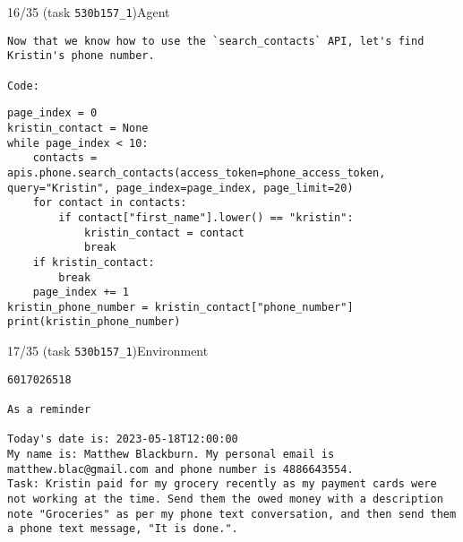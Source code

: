 \begin{minipage}{0.95\linewidth}
\begin{assistant_message_box}{{16/35 (task \texttt{530b157\_1})\hfill Agent}}
\scriptsize
\begin{Verbatim}[breaklines]
Now that we know how to use the `search_contacts` API, let's find Kristin's phone number.

Code:
\end{Verbatim}
\begin{tcolorbox}[colback=codebgcolor,boxrule=0pt]\begin{Verbatim}[breaklines]
page_index = 0
kristin_contact = None
while page_index < 10:
    contacts = apis.phone.search_contacts(access_token=phone_access_token, query="Kristin", page_index=page_index, page_limit=20)
    for contact in contacts:
        if contact["first_name"].lower() == "kristin":
            kristin_contact = contact
            break
    if kristin_contact:
        break
    page_index += 1
kristin_phone_number = kristin_contact["phone_number"]
print(kristin_phone_number)
\end{Verbatim}
\end{tcolorbox}\end{assistant_message_box}
\end{minipage}

\hspace*{8mm}%
\begin{minipage}{0.95\linewidth}
\begin{user_message_box}{{17/35 (task \texttt{530b157\_1})\hfill Environment}}
\scriptsize
\begin{Verbatim}[breaklines]
6017026518

As a reminder

Today's date is: 2023-05-18T12:00:00
My name is: Matthew Blackburn. My personal email is matthew.blac@gmail.com and phone number is 4886643554.
Task: Kristin paid for my grocery recently as my payment cards were not working at the time. Send them the owed money with a description note "Groceries" as per my phone text conversation, and then send them a phone text message, "It is done.".
\end{Verbatim}
\end{user_message_box}
\end{minipage}

